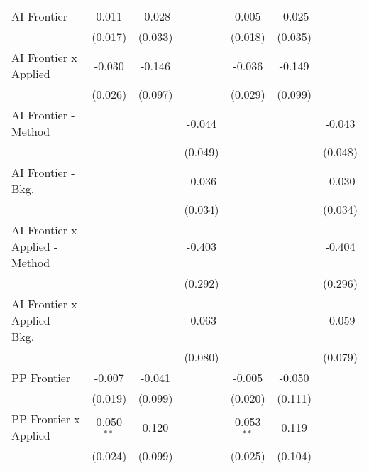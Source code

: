 \begin{tabular}{lcccccc}
   AI Frontier                    & 0.011         & -0.028        &             & 0.005         & -0.025        &   \\   
                                  & (0.017)       & (0.033)       &             & (0.018)       & (0.035)       &   \\   
   AI Frontier x Applied          & -0.030        & -0.146        &             & -0.036        & -0.149        &   \\   
                                  & (0.026)       & (0.097)       &             & (0.029)       & (0.099)       &   \\   
   AI Frontier - Method           &               &               & -0.044      &               &               & -0.043\\   
                                  &               &               & (0.049)     &               &               & (0.048)\\   
   AI Frontier - Bkg.             &               &               & -0.036      &               &               & -0.030\\   
                                  &               &               & (0.034)     &               &               & (0.034)\\   
   AI Frontier x Applied - Method &               &               & -0.403      &               &               & -0.404\\   
                                  &               &               & (0.292)     &               &               & (0.296)\\   
   AI Frontier x Applied - Bkg.   &               &               & -0.063      &               &               & -0.059\\   
                                  &               &               & (0.080)     &               &               & (0.079)\\   
   PP Frontier                    & -0.007        & -0.041        &             & -0.005        & -0.050        &   \\   
                                  & (0.019)       & (0.099)       &             & (0.020)       & (0.111)       &   \\   
   PP Frontier x Applied          & 0.050$^{**}$  & 0.120         &             & 0.053$^{**}$  & 0.119         &   \\   
                                  & (0.024)       & (0.099)       &             & (0.025)       & (0.104)       &   \\   

\end{tabular}
